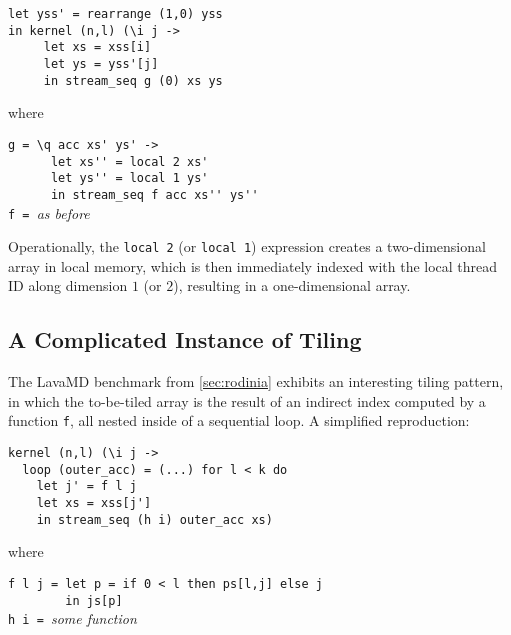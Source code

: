 \begin{lstlisting}
let yss' = rearrange (1,0) yss
in kernel (n,l) (\i j ->
     let xs = xss[i]
     let ys = yss'[j]
     in stream_seq g (0) xs ys
\end{lstlisting}
\begin{minipage}[t]{0.1\linewidth}
  \begin{flushright}
    where
  \end{flushright}
\end{minipage}
\begin{minipage}[t]{0.8\linewidth}
\lstinline{g = \q acc xs' ys' ->}\\
\lstinline{      let xs'' = local 2 xs'}\\
\lstinline{      let ys'' = local 1 ys'}\\
\lstinline{      in stream_seq f acc xs'' ys''}\\
\lstinline{f = }\textit{as before}
\end{minipage}
\vspace{1em}

Operationally, the \lstinline{local 2} (or \lstinline{local 1})
expression creates a two-dimensional array in local memory, which is
then immediately indexed with the local thread ID along dimension $1$
(or $2$), resulting in a one-dimensional array.

\subsection{A Complicated Instance of Tiling}
\label{sec:lavamd-tiling}

The LavaMD benchmark from \cref{sec:rodinia} exhibits an interesting
tiling pattern, in which the to-be-tiled array is the result of an
indirect index computed by a function \texttt{f}, all nested inside of
a sequential loop.  A simplified reproduction:

\begin{lstlisting}
kernel (n,l) (\i j ->
  loop (outer_acc) = (...) for l < k do
    let j' = f l j
    let xs = xss[j']
    in stream_seq (h i) outer_acc xs)
\end{lstlisting}
\begin{minipage}[t]{0.1\linewidth}
  \begin{flushright}
    where
  \end{flushright}
\end{minipage}
\begin{minipage}[t]{0.8\linewidth}
\lstinline{f l j = let p = if 0 < l then ps[l,j] else j}\\
\lstinline{        in js[p]}\\
\lstinline{h i = }\textit{some function}
\end{minipage}
\vspace{1em}

